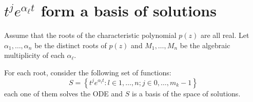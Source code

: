 \documentclass[12pt]{extarticle}
\numberwithin{equation}{section}
\begin{document}
\section{\texorpdfstring{$t^j e^{\alpha_\ell t}$ form a basis of solutions}{Basis of solutions}}

\begin{theorem}{}{}
    Assume that the roots of the characteristic polynomial $p(z)$ are all real.
    Let $\alpha_1, \dots, \alpha_n$ be the distinct roots of $p(z)$ and
    $M_1, \dots, M_n$ be the algebraic multiplicity of each $\alpha_\ell$.

    For each root, consider the following set of functions:
    \begin{equation}
        S = \left\{ t^j e^{\alpha_l t} : l \in 1, \dots, n; j \in 0, \dots, m_k -1 \right\}
    \end{equation}
    each one of them solves the ODE and $S$ is a basis of the space of solutions.
\end{theorem}
\end{document}
